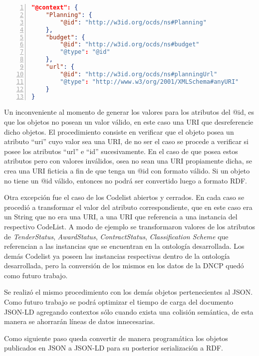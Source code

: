 \hfill \break

\noindent\begin{minipage}{\textwidth}
\begin{lstlisting}[captionpos=b, caption=Contexto del Objeto Planning, label=lst:json4,  numbers=left, language=json, firstnumber=1, numberstyle=\tiny\color{mygray},frame=single]
"@context": {
    "Planning": {
        "@id": "http://w3id.org/ocds/ns#Planning"
    },
    "budget": {
        "@id": "http://w3id.org/ocds/ns#budget"
        "@type": "@id"
    },
    "url": {
        "@id": "http://w3id.org/ocds/ns#planningUrl"
        "@type": "http://www.w3/org/2001/XMLSchema#anyURI"
    }
}

\end{lstlisting}
\end{minipage}

Un inconveniente al momento de generar los valores para los atributos del @id, es que los objetos no posean un valor válido, en este caso una URI que desreferencie dicho objetos. El procedimiento consiste en verificar que el objeto posea un atributo “uri” cuyo valor sea una URI, de no ser el caso se procede a verificar si posee los atributos “url” e “id” sucesivamente. En el caso de que posea estos atributos pero con valores inválidos, osea no sean una URI propiamente dicha, se crea una URI ficticia a fin de que tenga un @id con formato válido. Si un objeto no tiene un @id válido, entonces no podrá ser convertido luego a formato RDF.

Otra excepción fue el caso de los Codelist abiertos y cerrados. En cada caso se procedió a transformar el valor del atributo correspondiente, que en este caso era un String que no era una URI, a una URI que referencia a una instancia del respectivo CodeList. A modo de ejemplo se transformaron valores de los atributos de \textit{TenderStatus}, \textit{AwardStatus}, \textit{ContractStatus}, \textit{Classification Scheme} que referencian a las instancias que se encuentran en la ontología desarrollada. Los demás Codelist ya poseen las instancias respectivas dentro de la ontología desarrollada, pero la conversión de los mismos en los datos de la DNCP quedó como futuro trabajo.

Se realizó el mismo procedimiento con los demás objetos pertenecientes al JSON. Como futuro trabajo se podrá optimizar el tiempo de carga del documento JSON-LD agregando contextos sólo cuando exista una colisión semántica, de esta manera se ahorrarán líneas de datos innecesarias.

Como siguiente paso queda convertir de manera programática los objetos publicados en JSON a JSON-LD para su posterior serialización a RDF.


